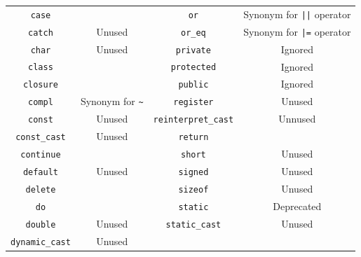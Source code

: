 \documentclass[openright,twoside,12pt]{report}
\begin{document}
\begin{table}[htp]
\begin{tabular}{|c|c||c|c|}
    \lstinline"case"              &                                         &
    \lstinline"or"                & Synonym for \lstinline-||- operator     \\
    \lstinline"catch"             & Unused                                  &
    \lstinline"or_eq"             & Synonym for \lstinline-|=- operator     \\
    \lstinline"char"              & Unused                                  &
    \lstinline"private"           & Ignored                                 \\
    \lstinline"class"             &                                         &
    \lstinline"protected"         & Ignored                                 \\
    \lstinline"closure"           &                                         &
    \lstinline"public"            & Ignored                                 \\
    \lstinline"compl"             & Synonym for \lstinline|~|               &
    \lstinline"register"          & Unused                                  \\
    \lstinline"const"             & Unused                                  &
    \lstinline"reinterpret_cast"  & Unnused                                 \\
    \lstinline"const_cast"        & Unused                                  &
    \lstinline"return"            &                                         \\
    \lstinline"continue"          &                                         &
    \lstinline"short"             & Unused                                  \\
    \lstinline"default"           & Unused                                  &
    \lstinline"signed"            & Unused                                  \\
    \lstinline"delete"            &                                         &
    \lstinline"sizeof"            & Unused                                  \\
    \lstinline"do"                &                                         &
    \lstinline"static"            & Deprecated                              \\
    \lstinline"double"            & Unused                                  &
    \lstinline"static_cast"       & Unused                                  \\
    \lstinline"dynamic_cast"      & Unused                                  &

\end{tabular}
\end{table}
\end{document}
